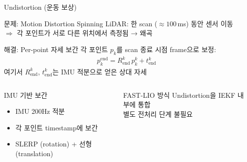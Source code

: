 \begin{frame}{Undistortion (운동 보상)}
  \begin{alertblock}{문제: Motion Distortion}
    Spinning LiDAR: 한 scan ($\approx100\,$ms) 동안 센서 이동\\
    $\Rightarrow$ 각 포인트가 서로 다른 위치에서 측정됨 → 왜곡
  \end{alertblock}
  \pause
  \begin{block}{해결: Per-point 자세 보간}
    각 포인트 $p_k$를 scan 종료 시점 frame으로 보정:
    \begin{align*}
      p_k^{\text{end}} = R_{\text{end}}^k\,p_k^k + t_{\text{end}}^k
    \end{align*}
    여기서 $R_{\text{end}}^k$, $t_{\text{end}}^k$는 IMU 적분으로 얻은 상대 자세
  \end{block}
  \pause
  \begin{columns}
    \begin{block}{IMU 기반 보간}
      \begin{itemize}
        \item IMU 200Hz 적분
        \item 각 포인트 timestamp에 보간
        \item SLERP (rotation) + 선형 (translation)
      \end{itemize}
    \end{block}
    \begin{exampleblock}{FAST-LIO 방식}
      Undistortion을 IEKF 내부에 통합\\
      별도 전처리 단계 불필요
    \end{exampleblock}
  \end{columns}
\end{frame}

